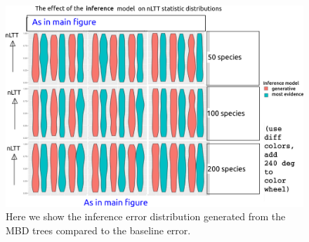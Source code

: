 \begin{figure}[!htbp]
  \includegraphics[width=\textwidth]{razzo-figures/fig_results.png}
  \caption{
    Here we show the inference error distribution generated from the MBD trees compared to the baseline error.
  }
  \label{fig:results}
\end{figure}